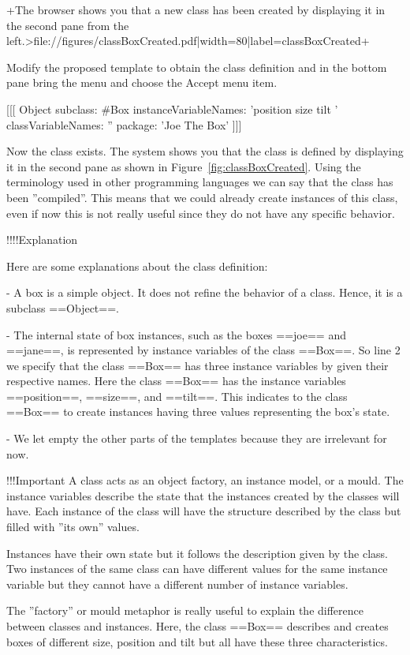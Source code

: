 +The browser shows you that a new class has been created by displaying it in the second pane from the left.>file://figures/classBoxCreated.pdf|width=80|label=classBoxCreated+ 

Modify the proposed template to obtain the class definition and in the bottom pane bring the menu and choose the Accept menu item. 

[[[
Object subclass: #Box
   instanceVariableNames: 'position size tilt '
   classVariableNames: ''
   package: 'Joe The Box'
]]]

Now the class exists. The system shows you that the class is defined by displaying it in the second pane as shown in Figure~\ref{fig:classBoxCreated}.  Using the terminology used in other programming languages we can say that the
class has been ''compiled''.  This means that we could already
create instances of this class, even if now this is not really useful
since they do not have any specific behavior.
	
!!!!Explanation 

Here are some explanations about the class definition: 

- A box is a simple object. It does not refine the behavior of a class. Hence, it is a subclass ==Object==.

- The internal state of box instances, such as the boxes ==joe== and ==jane==, is represented by instance variables of the class ==Box==.  So line 2 we specify that the class ==Box== has three instance variables by given their respective names.  Here the class ==Box== has the instance variables ==position==, ==size==, and ==tilt==.  This indicates to the class ==Box== to create instances having three values representing the box's state. 

- We let empty the other parts of the templates because they are irrelevant for now.


!!!Important
A class acts as an object factory, an instance model, or a mould. 
The instance variables describe the state that  the instances created 
by the classes will have. Each instance of the class will have the structure 
described by the class but filled with ''its own'' values.


Instances have their own state but it follows the description given by the class. Two instances of the same class can have different values for the same instance variable but they cannot have a different number of instance variables. 


The ''factory'' or mould metaphor is really useful to explain the difference between classes and instances. Here, the class ==Box== describes and creates boxes of different size, position and tilt but all have these three characteristics.

